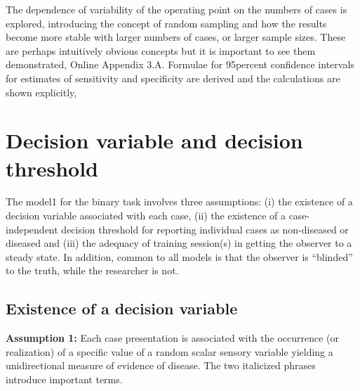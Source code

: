 \documentclass[
]{book}
\begin{document}
The dependence of variability of the operating point on the numbers of cases is explored, introducing the concept of random sampling and how the results become more stable with larger numbers of cases, or larger sample sizes. These are perhaps intuitively obvious concepts but it is important to see them demonstrated, Online Appendix 3.A. Formulae for 95percent confidence intervals for estimates of sensitivity and specificity are derived and the calculations are shown explicitly,

\hypertarget{decision-variable-and-decision-threshold}{%
\section{Decision variable and decision threshold}\label{decision-variable-and-decision-threshold}}

The model1 for the binary task involves three assumptions: (i) the existence of a decision variable associated with each case, (ii) the existence of a case-independent decision threshold for reporting individual cases as non-diseased or diseased and (iii) the adequacy of training session(s) in getting the observer to a steady state. In addition, common to all models is that the observer is ``blinded'' to the truth, while the researcher is not.

\hypertarget{existence-of-a-decision-variable}{%
\subsection{Existence of a decision variable}\label{existence-of-a-decision-variable}}

\textbf{Assumption 1:} Each case presentation is associated with the occurrence (or realization) of a specific value of a random scalar sensory variable yielding a unidirectional measure of evidence of disease. The two italicized phrases introduce important terms.
\end{document}
